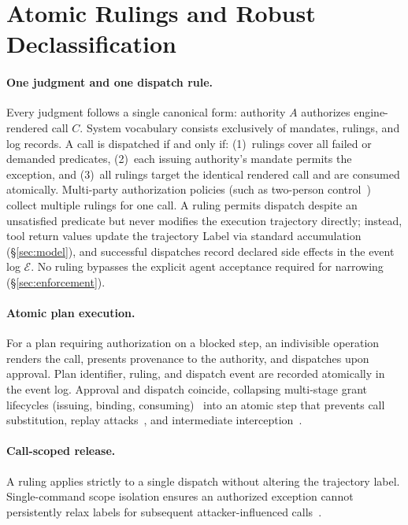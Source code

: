 \section{Atomic Rulings and Robust Declassification}\label{sec:rulings}

\paragraph{One judgment and one dispatch rule.}
Every judgment follows a single canonical form: authority $A$ authorizes engine-rendered call $C$. System vocabulary consists exclusively of mandates, rulings, and log records. A call is dispatched if and only if: (1)~rulings cover all failed or demanded predicates, (2)~each issuing authority's mandate permits the exception, and (3)~all rulings target the identical rendered call and are consumed atomically. Multi-party authorization policies (such as two-person control~\cite{saltzer1975protection}) collect multiple rulings for one call. A ruling permits dispatch despite an unsatisfied predicate but never modifies the execution trajectory directly; instead, tool return values update the trajectory Label via standard accumulation (\S\ref{sec:model}), and successful dispatches record declared side effects in the event log $\mathcal{E}$. No ruling bypasses the explicit agent acceptance required for narrowing (\S\ref{sec:enforcement}).

\paragraph{Atomic plan execution.}
For a plan requiring authorization on a blocked step, an indivisible operation renders the call, presents provenance to the authority, and dispatches upon approval. Plan identifier, ruling, and dispatch event are recorded atomically in the event log. Approval and dispatch coincide, collapsing multi-stage grant lifecycles (issuing, binding, consuming)~\cite{miller2003paradigm} into an atomic step that prevents call substitution, replay attacks~\cite{needham1978using}, and intermediate interception~\cite{wadler1990linear}.

\paragraph{Call-scoped release.}
A ruling applies strictly to a single dispatch without altering the trajectory label. Single-command scope isolation ensures an authorized exception cannot persistently relax labels for subsequent attacker-influenced calls~\cite{saltzer1975protection}.

